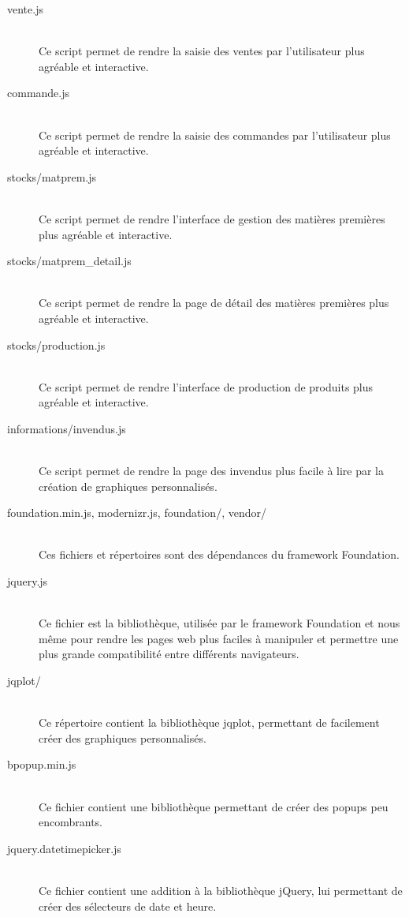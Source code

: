 \begin{description}
            \item[vente.js]\hfill \\
                Ce script permet de rendre la saisie des ventes par 
                l'utilisateur plus agréable et interactive.
            \item[commande.js]\hfill \\
                Ce script permet de rendre la saisie des commandes par 
                l'utilisateur plus agréable et interactive.
            \item[stocks/matprem.js]\hfill \\
                Ce script permet de rendre l'interface de gestion des matières
                premières plus agréable et interactive.
            \item[stocks/matprem\_detail.js]\hfill \\
                Ce script permet de rendre la page de détail des matières
                premières plus agréable et interactive.
            \item[stocks/production.js]\hfill \\
                Ce script permet de rendre l'interface de production de
                produits plus agréable et interactive.
            \item[informations/invendus.js]\hfill \\
                Ce script permet de rendre la page des invendus plus facile
                à lire par la création de graphiques personnalisés.
            \item[foundation.min.js, modernizr.js, foundation/, vendor/]\hfill \\
                Ces fichiers et répertoires sont des dépendances du framework
                Foundation.
            \item[jquery.js]\hfill \\
                Ce fichier est la bibliothèque, utilisée par le framework
                Foundation et nous même pour rendre les pages web plus faciles
                à manipuler et permettre une plus grande compatibilité entre
                différents navigateurs.
            \item[jqplot/]\hfill \\
                Ce répertoire contient la bibliothèque jqplot, permettant
                de facilement créer des graphiques personnalisés.
            \item[bpopup.min.js]\hfill \\
                Ce fichier contient une bibliothèque permettant de créer des
                popups peu encombrants.
            \item[jquery.datetimepicker.js]\hfill \\
                Ce fichier contient une addition à la bibliothèque jQuery, lui
                permettant de créer des sélecteurs de date et heure.
        \end{description}


